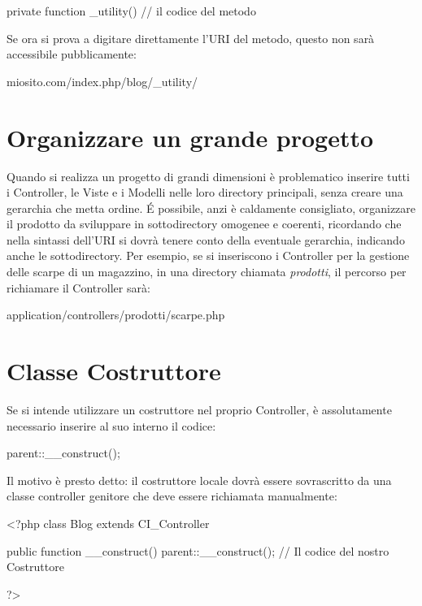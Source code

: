 \begin{code}
private function _utility()
{
  // il codice del metodo
}
\end{code}

Se ora si prova a digitare direttamente l'\ac{URI} del metodo, questo non sarà accessibile pubblicamente:

\begin{code}
miosito.com/index.php/blog/_utility/
\end{code}

\section*{Organizzare un grande progetto}
Quando si realizza un progetto di grandi dimensioni è problematico inserire tutti i Controller, le Viste e i Modelli nelle loro directory principali, senza creare una gerarchia che metta ordine. \'E possibile, anzi è caldamente consigliato, organizzare il prodotto da sviluppare in sottodirectory omogenee e coerenti, ricordando che nella sintassi dell'\ac{URI} si dovrà tenere conto della eventuale gerarchia, indicando anche le sottodirectory. Per esempio, se si inseriscono i Controller per la gestione delle scarpe di un magazzino, in una directory chiamata \emph{prodotti}, il percorso per richiamare il Controller  sarà:

\begin{code}
application/controllers/prodotti/scarpe.php
\end{code}

\section*{Classe Costruttore}
Se si intende utilizzare un costruttore nel proprio Controller, è assolutamente necessario inserire al suo interno il codice:

\begin{code}
parent::__construct();
\end{code}

Il motivo è presto detto: il costruttore locale dovrà essere sovrascritto da una classe controller genitore che deve essere richiamata manualmente:

\begin{code}
<?php
class Blog extends CI_Controller {

       public function __construct()
       {
            parent::__construct();
            // Il codice del nostro Costruttore
       }
}
?>
\end{code}

